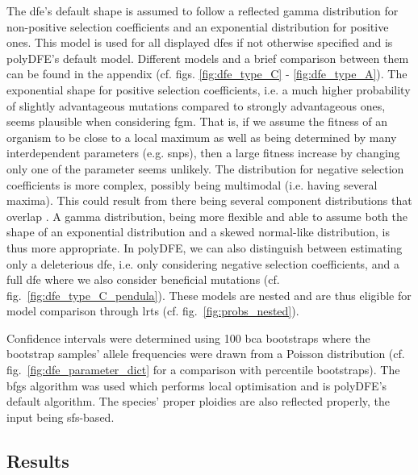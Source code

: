 \documentclass[hidelinks,11pt]{article}
\begin{document}
    The \acrshort{dfe}'s default shape is assumed to follow a reflected gamma distribution for non-positive selection coefficients and an exponential distribution for positive ones. This model is used for all displayed \acrshort{dfe}s if not otherwise specified and is polyDFE's default model. Different models and a brief comparison between them can be found in the appendix (cf. figs. \ref{fig:dfe_type_C} - \ref{fig:dfe_type_A}). The exponential shape for positive selection coefficients, i.e. a much higher probability of slightly advantageous mutations compared to strongly advantageous ones, seems plausible when considering \acrfull{fgm}. That is, if we assume the fitness of an organism to be close to a local maximum as well as being determined by many interdependent parameters (e.g. \acrshort{snp}s), then a large fitness increase by changing only one of the parameter seems unlikely. The distribution for negative selection coefficients is more complex, possibly being multimodal (i.e. having several maxima). This could result from there being several component distributions that overlap \cite{dfe-review}. A gamma distribution, being more flexible and able to assume both the shape of an exponential distribution and a skewed normal-like distribution, is thus more appropriate. In polyDFE, we can also distinguish between estimating only a deleterious \acrshort{dfe}, i.e. only considering negative selection coefficients, and a full \acrshort{dfe} where we also consider beneficial mutations (cf. fig.~\ref{fig:dfe_type_C_pendula}). These models are nested and are thus eligible for model comparison through \acrlong{lrt}s (cf. fig.~\ref{fig:probs_nested}).

    Confidence intervals were determined using 100 \acrfull{bca} bootstraps where the bootstrap samples' allele frequencies were drawn from a Poisson distribution (cf. fig.~\ref{fig:dfe_parameter_dict} for a comparison with percentile bootstraps). The \acrshort{bfgs} algorithm was used which performs local optimisation and is polyDFE's default algorithm. The species' proper ploidies are also reflected properly, the input being \acrshort{sfs}-based.

    \subsection{Results}
\end{document}
